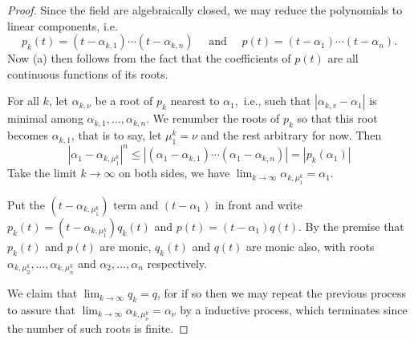 \documentclass[10pt]{report}
\theoremstyle{definition}
\begin{document}
\begin{proof}{}\leavevmode{}
Since the field are algebraically closed, we may reduce the polynomials to linear components, i.e.
$$p_{k}(t)=\left(t-\alpha_{k, 1}\right) \cdots\left(t-\alpha_{k, n}\right)\quad\text { and }\quad p(t)=\left(t-\alpha_{1}\right) \cdots\left(t-\alpha_{n}\right).$$
Now (a) then follows from the fact that the coefficients of $p(t)$ are all continuous functions of its roots.

For all $k$, let $\alpha_{k, \nu}$ be a root of $p_{k}$ nearest to $\alpha_{1},$ i.e., such that $\left|\alpha_{k, v}-\alpha_{1}\right|$ is minimal among $\alpha_{k,1},\dots,\alpha_{k,n}$. We renumber the roots of $p_{k}$ so that this root becomes $\alpha_{k, 1}$, that is to say, let $\mu^k_1=\nu$ and the rest arbitrary for now. Then
\[
\left|\alpha_{1}-\alpha_{k, \mu^k_1}\right|^{n} \leq\left|\left(\alpha_{1}-\alpha_{k, 1}\right) \cdots\left(\alpha_{1}-\alpha_{k, n}\right)\right|=\left|p_{k}\left(\alpha_{1}\right)\right|
\]
Take the limit $k\to\infty$ on both sides, we have $\lim_{k\to\infty}\alpha_{k,\mu^k_1}=\alpha_1$.

Put the $(t-\alpha_{k,\mu^k_1})$ term and $(t-\alpha_1)$ in front and write $p_k(t)=(t-\alpha_{k,\mu^k_1})q_k(t)$ and $p(t)=\left(t-\alpha_{1}\right) q(t)$. By the premise that $p_k(t)$ and $p(t)$ are monic, $q_k(t)$ and $q(t)$ are monic also, with roots $\alpha_{k,\mu^k_2},\dots,\alpha_{k,\mu^k_n}$ and $\alpha_2,\dots,\alpha_n$ respectively.

We claim that $\lim_{k\to\infty}q_k=q$, for if so then we may repeat the previous process to assure that $\lim_{k\to\infty}\alpha_{k,\mu^k_\nu}=\alpha_\nu$ by a inductive process, which terminates since the number of such roots is finite.


\end{proof}
\end{document}
